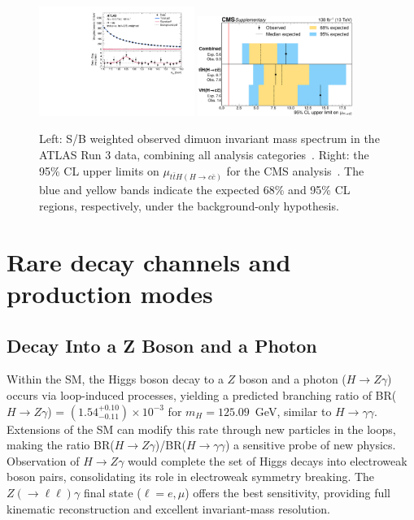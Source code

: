 \documentclass[a4paper,11pt]{article}
\begin{document}
\begin{figure}[!tbp]
\centering
\includegraphics[width=0.45\textwidth]{hmumu-atlas}
\includegraphics[width=0.45\textwidth]{ttHcc-cms}
\caption
    {Left: S/B weighted observed dimuon invariant mass spectrum in the
      ATLAS Run 3 data, combining all analysis
      categories~\cite{hmumu-atlas}. Right: the 95\% CL upper limits on
      $\mu_{t\bar t H(H\to c\bar c)}$ for the CMS analysis~\cite{tthcc-cms}. The blue
      and yellow bands indicate the expected 68\% and 95\% CL regions,
      respectively, under the background-only hypothesis.
      \label{fig:gen2f}
    }
\end{figure}

\section{Rare decay channels and production modes}

\subsection{Decay Into a Z Boson and a Photon}

Within the SM, the Higgs boson decay to a $Z$ boson and a photon ($H
\to Z\gamma$) occurs via loop-induced processes, yielding a predicted
branching ratio of BR($H \to Z\gamma$) = $(1.54^{+0.10}_{-0.11})
\times 10^{-3}$ for $m_H = 125.09$~GeV, similar to $H \to
\gamma\gamma$. Extensions of the SM can modify this rate through new
particles in the loops, making the ratio BR($H \to Z\gamma$)/BR($H \to
\gamma\gamma$) a sensitive probe of new physics. Observation of $H \to
Z\gamma$ would complete the set of Higgs decays into electroweak boson
pairs, consolidating its role in electroweak symmetry breaking. The
$Z(\to \ell\ell)\gamma$ final state ($\ell=e,\mu$) offers the best
sensitivity, providing full kinematic reconstruction and excellent
invariant-mass resolution.
\end{document}

